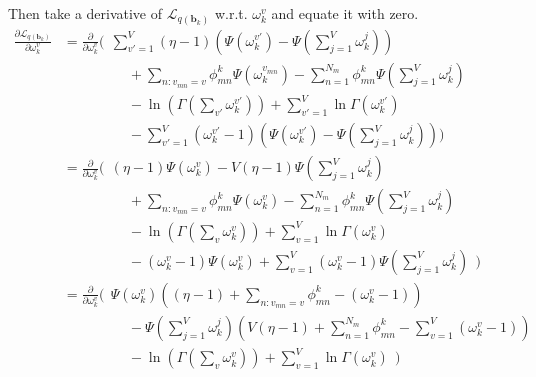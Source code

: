 \documentclass[a4]{article}
\begin{document}
Then take a derivative of $\mathcal{L}_{q(\mathbf{b}_{k})}$ w.r.t. $\omega_k^v$ and equate it with zero.
\begin{equation}
\begin{aligned}
    \frac{\partial\mathcal{L}_{q(\mathbf{b}_{k})}}
         {\partial \omega_k^v}
&=
    \frac{\partial}{\partial\omega_k^v}
    \Big(\:\:
      \sum_{v'=1}^{V} (\eta - 1)
      \left(
          \Psi( \omega_{k}^{v'} ) - \Psi( \sum_{j=1}^{V} \omega_{k}^j )
      \right)\\
&\:\:\:\:\:\:\:\:\:\:\:\:\:\:\:\:\:\:\:\:\:+
      \sum_{n:v_{mn}=v} \phi_{mn}^{k}\Psi( \omega_{k}^{v_{mn}} )
      - \sum_{n=1}^{N_m} \phi_{mn}^{k}\Psi( \sum_{j=1}^{V} \omega_{k}^j )\\
&\:\:\:\:\:\:\:\:\:\:\:\:\:\:\:\:\:\:\:\:\:-
       \ln \left( \Gamma( \sum_{v'} \omega_k^{v'} ) \right)
         + \sum_{v'=1}^{V} \ln \Gamma( \omega_k^{v'} )\\
&\:\:\:\:\:\:\:\:\:\:\:\:\:\:\:\:\:\:\:\:\:-
          \sum_{v'=1}^{V} ( \omega_k^{v'} - 1 )
           \left(
           \Psi( \omega_{k}^{v'} ) - \Psi( \sum_{j=1}^{V} \omega_{k}^j )
           \right)\Big)\\
&=
    \frac{\partial}{\partial\omega_k^v} 
    \Big(\:\:
        (\eta - 1) \Psi( \omega_{k}^v )
          - V(\eta -1) \Psi( \sum_{j=1}^{V} \omega_{k}^j )\\
&\:\:\:\:\:\:\:\:\:\:\:\:\:\:\:\:\:\:\:\:\:+
      \sum_{n:v_{mn}=v} \phi_{mn}^{k}\Psi( \omega_{k}^{v} )
      - \sum_{n=1}^{N_m} \phi_{mn}^{k}\Psi( \sum_{j=1}^{V} \omega_{k}^j )\\
&\:\:\:\:\:\:\:\:\:\:\:\:\:\:\:\:\:\:\:\:\:-
       \ln \left( \Gamma( \sum_v \omega_k^v ) \right)
         + \sum_{v=1}^{V} \ln \Gamma( \omega_k^v )\\
&\:\:\:\:\:\:\:\:\:\:\:\:\:\:\:\:\:\:\:\:\:-
          ( \omega_k^v - 1 ) \Psi( \omega_{k}^v )
         + \sum_{v=1}^{V} ( \omega_k^v - 1 )
           \Psi( \sum_{j=1}^{V} \omega_{k}^j )\:\:\Big)\\
&=
    \frac{\partial}{\partial\omega_k^v} 
    \Big(\:\:
        \Psi( \omega_{k}^v )
        \left(
            (\eta - 1) +
            \sum_{n:v_{mn}=v} \phi_{mn}^{k}
           - (\omega_k^v - 1 )
        \right)\\
&\:\:\:\:\:\:\:\:\:\:\:\:\:\:\:\:\:\:\:\:\:-
        \Psi( \sum_{j=1}^{V} \omega_{k}^j )
        \left(
            V(\eta - 1) +
            \sum_{n=1}^{N_m} \phi_{mn}^{k} -
            \sum_{v=1}^{V} ( \omega_k^v - 1 )
        \right)\\
&\:\:\:\:\:\:\:\:\:\:\:\:\:\:\:\:\:\:\:\:\:-
       \ln \left( \Gamma( \sum_v \omega_k^v ) \right)
         + \sum_{v=1}^{V} \ln \Gamma( \omega_k^v )\:\:\Big)\\
\\
\end{aligned}
\end{equation}
\end{document}
